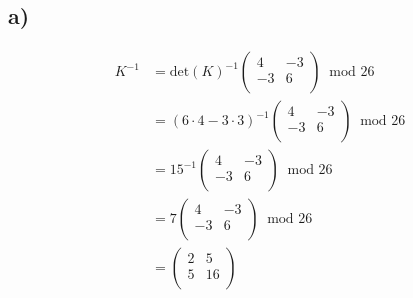 \documentclass{article}
\begin{document}
\subsection*{a)}
\begin{align*}
K^{-1}&=\text{det}(K)^{-1}\begin{pmatrix}4 &-3\\ -3 & 6\\\end{pmatrix}\;\;\text{mod }26\\
&=(6\cdot4-3\cdot3)^{-1}\begin{pmatrix}4 &-3\\ -3 & 6\\\end{pmatrix}\;\;\text{mod }26\\
&=15^{-1}\begin{pmatrix}4 &-3\\ -3 & 6\\\end{pmatrix}\;\;\text{mod }26\\
&=7\begin{pmatrix}4 &-3\\ -3 & 6\\\end{pmatrix}\;\;\text{mod }26\\
&=\begin{pmatrix}2 &5\\ 5 & 16\\\end{pmatrix}\\
\end{align*}
\end{document}
